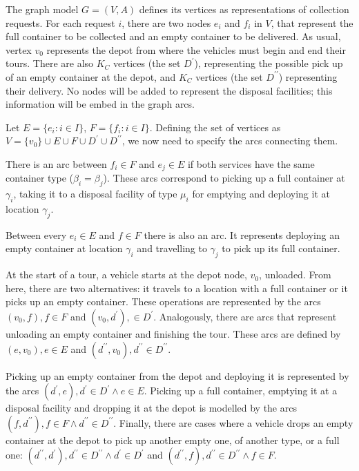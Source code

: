 The graph model $G = (V, A)$ defines its vertices as representations of
collection requests. For each request $i$, there are two nodes $e_i$ and $f_i$
in $V$, that represent the full container to be collected and an empty
container to be delivered. As usual, vertex $v_0$ represents the
depot from where the vehicles must begin and end their tours. There are also
$K_C$ vertices (the set $D^\prime$), representing the possible pick up of an
empty container at the depot, and $K_C$ vertices (the set $D^{\prime\prime}$)
representing their delivery. No nodes will be added to represent the disposal
facilities; this information will be embed in the graph arcs.

Let $E = \{e_i : i \in I\}$, $F = \{f_i : i \in I\}$. Defining the set of
vertices as $V = \{v_0\} \cup E \cup F \cup D^\prime \cup D^{\prime\prime}$, we
now need to specify the arcs connecting them.

There is an arc between $f_i \in F$ and $e_j \in E$ if both services have the
same container type ($\beta_i = \beta_j$). These arcs correspond to picking up
a full container at $\gamma_i$, taking it to a disposal facility of type
$\mu_i$ for emptying and deploying it at location $\gamma_j$.

Between every $e_i \in E$ and $f \in F$ there is also an arc. It represents
deploying an empty container at location $\gamma_i$ and travelling to
$\gamma_j$ to pick up its full container.

At the start of a tour, a vehicle starts at the depot node, $v_0$, unloaded.
From here, there are two alternatives: it travels to a location with a full
container or it picks up an empty container. These operations are represented
by the arcs $(v_0, f), f \in F$ and $(v_0, d^\prime), \in D^\prime$.
Analogously, there are arcs that represent unloading an empty container and
finishing the tour. These arcs are defined by $(e, v_0), e \in E$ and
$(d^{\prime\prime}, v_0), d^{\prime\prime} \in D^{\prime\prime}$.

Picking up an empty container from the depot and deploying it is represented by
the arcs $(d^\prime, e), d^\prime \in D^\prime \wedge e \in E$. Picking up a
full container, emptying it at a disposal facility and dropping it at the depot
is modelled by the arcs $(f, d^{\prime\prime}), f \in F \wedge d^{\prime\prime}
\in D^{\prime\prime}$. Finally, there are cases where a vehicle drops an
empty container at the depot to pick up another empty one, of another type, or
a full one: $(d^{\prime\prime}, d^\prime), d^{\prime\prime} \in
D^{\prime\prime} \wedge d^\prime \in D^\prime$ and $(d^{\prime\prime}, f),
d^{\prime\prime} \in D^{\prime\prime} \wedge f \in F$.

